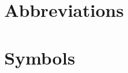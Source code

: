 \section*{Abbreviations}
\begin{symbollist}
\end{symbollist}
\section*{Symbols}
\begin{symbollist}
\end{symbollist}
